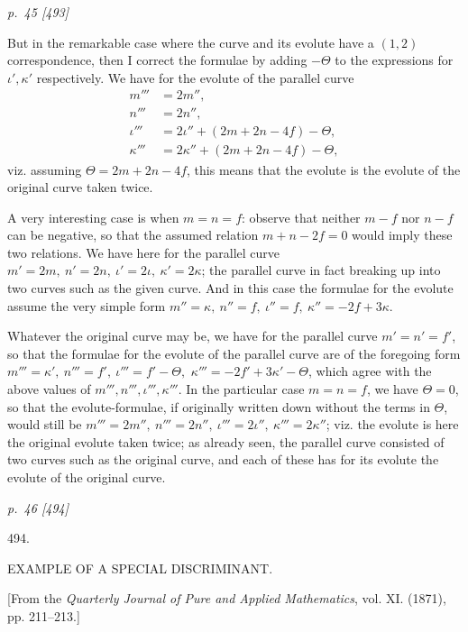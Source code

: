 ﻿\documentclass[11pt,a4paper]{article}
\theoremstyle{plain}
\theoremstyle{definition}
\begin{document}
\clearpage
\textit{p.~45 [493]}

But in the remarkable case where the curve and its evolute have a
\((1,2)\) correspondence, then I correct the formulae by adding
\(-\Theta\) to the expressions for \(\iota',\kappa'\) respectively. We
have for the evolute of the parallel curve
\[
\begin{aligned}
m'''&=2m'',\\
n'''&=2n'',\\
\iota'''&=2\iota''+(2m+2n-4f)-\Theta,\\
\kappa'''&=2\kappa''+(2m+2n-4f)-\Theta,
\end{aligned}
\]
viz. assuming \(\Theta=2m+2n-4f\), this means that the evolute is the
evolute of the original curve taken twice.

A very interesting case is when \(m=n=f\): observe that neither \(m-f\) nor
\(n-f\) can be negative, so that the assumed relation \(m+n-2f=0\) would
imply these two relations. We have here for the parallel curve
\(m'=2m,\ n'=2n,\ \iota'=2\iota,\ \kappa'=2\kappa\); the parallel curve in
fact breaking up into two curves such as the given curve. And in this case
the formulae for the evolute assume the very simple form
\(m''=\kappa,\ n''=f,\ \iota''=f,\ \kappa''=-2f+3\kappa\).

Whatever the original curve may be, we have for the parallel curve
\(m'=n'=f'\), so that the formulae for the evolute of the parallel curve
are of the foregoing form
\(m'''=\kappa',\ n'''=f',\ \iota'''=f'-\Theta,\)
\(\kappa'''=-2f'+3\kappa'-\Theta\), which agree with the above values of
\(m''',n''',\iota''',\kappa'''\). In the particular case \(m=n=f\), we have
\(\Theta=0\), so that the evolute-formulae, if originally written down
without the terms in \(\Theta\), would still be
\(m'''=2m'',\ n'''=2n'',\ \iota'''=2\iota'',\ \kappa'''=2\kappa''\); viz.
the evolute is here the original evolute taken twice; as already seen, the
parallel curve consisted of two curves such as the original curve, and
each of these has for its evolute the evolute of the original curve.

\clearpage
\textit{p.~46 [494]}

\begin{center}
{\Large 494.}

\vspace{1.5em}

{\large EXAMPLE OF A SPECIAL DISCRIMINANT.}

\vspace{1em}

[From the \textit{Quarterly Journal of Pure and Applied Mathematics},
vol. XI. (1871), pp. 211--213.]
\end{center}
\end{document}
